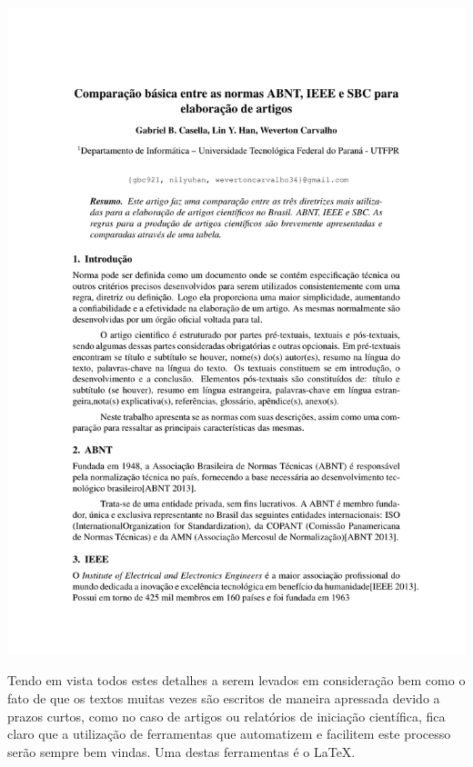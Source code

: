 {\noindent\includegraphics[trim=0 15cm 0 0,clip]{contents/intro_writing_conference/intro_writing_sbc}

\clearpage
\restoregeometry}

Tendo em vista todos estes detalhes a serem levados em consideração bem como o fato de que os textos muitas vezes são escritos de maneira apressada devido a prazos curtos, como no caso de artigos ou relatórios de iniciação científica, fica claro que a utilização de ferramentas que automatizem e facilitem este processo serão sempre bem vindas. Uma destas ferramentas é o \LaTeX.


